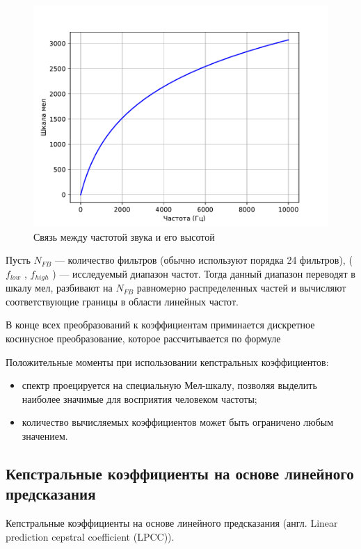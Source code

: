 \begin{figure}[h!]
	\includegraphics[pages=-]{./inc/img/1.pdf}
	\caption{Связь между частотой звука и его высотой}  
	\label{fig:xray}
\end{figure}

Пусть $N_{FB}$ — количество фильтров (обычно используют порядка 24 фильтров), ($f_{low}$ , $f_{high}$ ) — исследуемый диапазон частот. Тогда данный диапазон переводят в шкалу мел, разбивают на $N_{FB}$ равномерно распределенных частей и вычисляют соответствующие границы в области линейных частот. 

В конце всех преобразований к коэффициентам приминается дискретное косинусное преобразование, которое рассчитывается по формуле 

Положительные моменты при использовании кепстральных коэффициентов:
\begin{itemize}
	\item спектр проецируется на специальную Мел-шкалу, позволяя выделить наиболее значимые для восприятия человеком частоты;
	\item количество вычисляемых коэффициентов может быть ограничено любым значением.
\end{itemize}


	
\subsection{Кепстральные коэффициенты на основе линейного предсказания} \label{2}
Кепстральные коэффициенты на основе линейного предсказания (англ. Linear prediction cepstral coefficient (LPCC)). 

